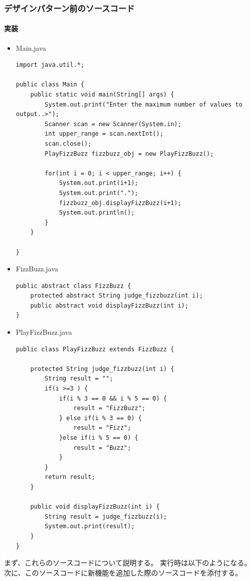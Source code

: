 \documentclass[dvipdfmx]{jsarticle}
\begin{document}
\subsubsection{デザインパターン前のソースコード}
\paragraph{実装}
\begin{itemize}
  \item Main.java
  \begin{verbatim}
import java.util.*;

public class Main {
    public static void main(String[] args) {
        System.out.print("Enter the maximum number of values to output..>");
        Scanner scan = new Scanner(System.in);
        int upper_range = scan.nextInt();
        scan.close();
        PlayFizzBuzz fizzbuzz_obj = new PlayFizzBuzz();

        for(int i = 0; i < upper_range; i++) {
            System.out.print(i+1);
            System.out.print(".");
            fizzbuzz_obj.displayFizzBuzz(i+1);
            System.out.println();
        }
    }

}
  \end{verbatim}
  \item FizzBuzz.java
  \begin{verbatim}
public abstract class FizzBuzz {
    protected abstract String judge_fizzbuzz(int i);
    public abstract void displayFizzBuzz(int i);
}
  \end{verbatim}
  \item PlayFizzBuzz.java
  \begin{verbatim}
public class PlayFizzBuzz extends FizzBuzz {

    protected String judge_fizzbuzz(int i) {
        String result = "";
        if(i >=3 ) {
            if(i % 3 == 0 && i % 5 == 0) {
                result = "FizzBuzz";
            } else if(i % 3 == 0) {
                result = "Fizz";
            }else if(i % 5 == 0) {
                result = "Buzz";
            }
        }
        return result;
    }

    public void displayFizzBuzz(int i) {
        String result = judge_fizzbuzz(i);
        System.out.print(result);
    }
}

  \end{verbatim}
\end{itemize}
まず、これらのソースコードについて説明する。
実行時は以下のようになる。
次に、このソースコードに新機能を追加した際のソースコードを添付する。
\end{document}
